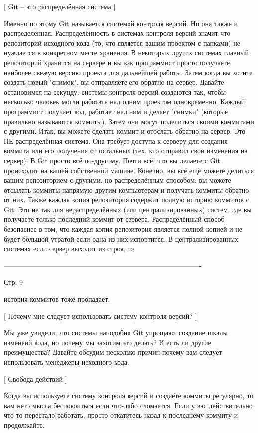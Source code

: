 [ Git -- это распределённая система ]

Именно по этому Git называется системой контроля версий. Но она также и
распределённая. Распределённость в системах контроля версий значит что репозиторий
исходного кода (то, что является вашим проектом с папками) не нуждается в конкретном
месте хранения. В некоторых других системах главный репозиторий хранится на сервере
и вы как программист просто получаете наиболее свежую версию проекта для дальнейшей
работы. Затем когда вы хотите создать новый "снимок", вы отправляете его обратно на
сервер.
Давайте остановимся на секунду: системы контроля версий создаются так, чтобы
несколько человек могли работать над одним проектом одновременно. Каждый программист
получает код, работает над ним и делает "снимки" (которые правильно называются 
коммиты). Затем они могут поделиться своими коммитами с другими.
Итак, вы можете сделать коммит и отослать обратно на сервер. Это НЕ распределённая
система. Она требует доступа к серверу для создания коммита или его получения от
остальных (тех, кто отправил свои изменения на сервер). В Git просто всё по-другому.
Почти всё, что вы делаете с Git происходит на вашей собственной машине. Конечно, вы
всё ещё можете делиться вашим репозиторием с другими, но распределённым способом:
вы можете отсылать коммиты напрямую другим компьютерам и получать коммиты обратно от
них. Также каждая копия репозитория содержит полную историю коммитов с Git. Это не
так для нераспределённых (или централизированных) систем, где вы получаете только
последний коммит от сервера. Распределённый способ безопаснее в том, что каждая
копия репозитория является полной копией и не будет большой утратой если одна из
них испортится. В централизированных системах если сервер выходит из строя, то

-------------------------------------------------------------------------------------

Стр. 9

история коммитов тоже пропадает.

[ Почему мне следует использовать систему контроля версий? ]

Мы уже увидели, что системы наподобии Git упрощают создание шкалы изменеий кода, но
почему мы захотим это делать? И есть ли другие преимущества? Давайте обсудим
несколько причин почему вам следует использовать менеджеры исходного кода.

[ Свобода действий ]

Когда вы используете систему контроля версий и создаёте коммиты регулярно, то вам нет
смысла беспокоиться если что-либо сломается. Если у вас действительно что-то
перестало работать, просто откатитесь назад к последнему коммиту и продолжайте.

